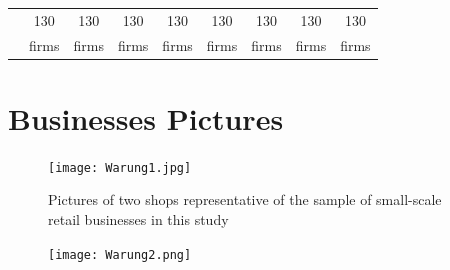 \documentclass[11.5pt]{article}
\begin{document}
\begin{appendices}
\begin{table}[h!]
\begin{tabular}{|c|c|c|c|c|c|c|c|c|}
	\multicolumn{1}{|c}{} & \multicolumn{1}{|c}{130} & \multicolumn{1}{|c}{130} & \multicolumn{1}{|c}{130} & \multicolumn{1}{|c}{130} & \multicolumn{1}{|c}{130} & \multicolumn{1}{|c}{130} & \multicolumn{1}{|c}{130} & \multicolumn{1}{|c|}{130}\\
	\multicolumn{1}{|c}{} & \multicolumn{1}{|c}{firms} & \multicolumn{1}{|c}{firms} & \multicolumn{1}{|c}{firms} & \multicolumn{1}{|c}{firms} & \multicolumn{1}{|c}{firms} & \multicolumn{1}{|c}{firms} & \multicolumn{1}{|c}{firms} & \multicolumn{1}{|c|}{firms}\\
	\hline
  \end{tabular}
\end{table}



\pagebreak




\section{Businesses Pictures}\label{sec:expbusinesses}

\begin{figure}[h!]
\centering
\caption{Pictures of two shops representative of the sample of small-scale retail businesses in this study}
\label{warung1}
    \texttt{[image: Warung1.jpg]}
\end{figure}

\begin{figure}[h!]
\centering
\label{warung2}
    \texttt{[image: Warung2.png]}
\end{figure}

\end{appendices}
\end{document}
